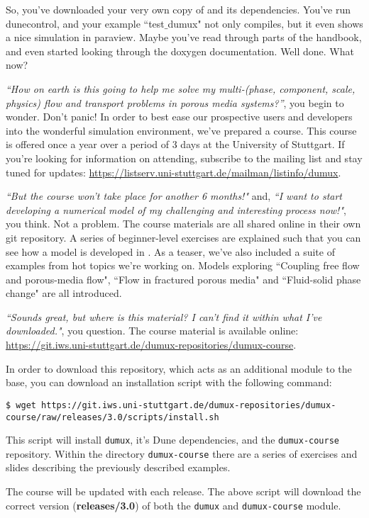 So, you've downloaded your very own copy of \Dumux and its dependencies.
You've run dunecontrol, and your example ``test$\_$dumux" not only compiles,
but it even shows a nice simulation in paraview. 
Maybe you've read through parts of the handbook, and even started looking 
through the doxygen documentation. 
Well done. What now? \par
%
\textit{``How on earth is this going to help me solve my multi-(phase, component, 
scale, physics) flow and transport problems in porous media systems?''}, you begin to wonder.
Don't panic! In order to best ease our prospective users and developers into the
wonderful \Dumux simulation environment, we've prepared a \Dumux course. 
This course is offered once a year over a period of 3 days at the University of Stuttgart.
If you're looking for information on attending, subscribe to the \Dumux mailing list 
and stay tuned for updates:
\url{https://listserv.uni-stuttgart.de/mailman/listinfo/dumux}. \par
%
\textit{``But the course won't take place for another 6 months!"} and, 
\textit{``I want to start developing a numerical model of my challenging and 
	interesting process now!"}, you think. 
Not a problem. The course materials are all shared online in their own 
git repository. A series of beginner-level exercises are explained 
such that you can see how a model is developed in \Dumux. As a teaser, we've
 also included a suite of examples from hot topics we're working on. Models
  exploring ``Coupling free flow and porous-media flow", ``Flow in fractured
   porous media" and ``Fluid-solid phase change" are all introduced.  \par
\textit{``Sounds great, but where is this material? I can't find it within
what I've downloaded."}, you question. 
The \Dumux course material is available online:
\url{https://git.iws.uni-stuttgart.de/dumux-repositories/dumux-course}. \par
In order to download this repository, which acts as an additional module to 
the \Dumux base, you can download an installation script with the following command:
\begin{lstlisting}[style=Bash]
$ wget https://git.iws.uni-stuttgart.de/dumux-repositories/dumux-course/raw/releases/3.0/scripts/install.sh
\end{lstlisting}
This script will install \texttt{dumux}, it's Dune dependencies, and the \texttt{dumux-course} 
repository. Within the directory \texttt{dumux-course} there are a series of exercises 
and slides describing the previously described examples. \par
%
The \Dumux course will be updated with each \Dumux release.
The above script will download the correct version (\textbf{releases/3.0}) of both
the \texttt{dumux} and \texttt{dumux-course} module.
